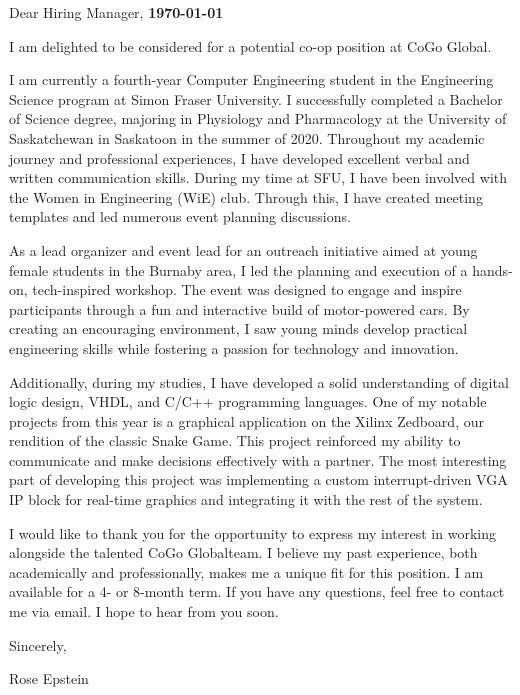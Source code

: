 \documentclass[letterpaper,11pt]{article}
\newcommand{\company}{CoGo Global\hspace{4px}}
\begin{document}
    \vspace*{10pt}
    \par Dear Hiring Manager,  \hfill \textbf{\today}
    \vspace*{10pt}
    \par I am delighted to be considered for a potential co-op position at \company{}.
    \vspace*{10pt}
    \par I am currently a fourth-year Computer Engineering student in the Engineering Science program at Simon Fraser University. I successfully
    completed a Bachelor of Science degree, majoring in Physiology and Pharmacology at the University of Saskatchewan in Saskatoon in the summer of 2020.
    Throughout my academic journey and professional experiences, I have developed excellent verbal and written communication skills. 
    During my time at SFU, I have been involved with the Women in Engineering (WiE) club. Through this, I have created meeting templates and led numerous event planning discussions. 
    \vspace*{10pt}
    \par As a lead organizer and event lead for an outreach initiative aimed at young female students in the Burnaby area, I led the planning and execution of a hands-on, tech-inspired workshop. 
    The event was designed to engage and inspire participants through a fun and interactive build of motor-powered cars. 
    By creating an encouraging environment, I saw young minds develop practical engineering skills while fostering a passion for technology and innovation.
    \vspace*{10pt}
    \par Additionally, during my studies, I have developed a solid understanding of digital logic design, VHDL, and C/C++ programming languages. 
    One of my notable projects from this year is a graphical application on the Xilinx Zedboard, our rendition of the classic Snake Game. This project reinforced 
    my ability to communicate and make decisions effectively with a partner. The most interesting part of developing this project was implementing a 
    custom interrupt-driven VGA IP block for real-time graphics and integrating it with the rest of the system.
    \vspace*{10pt}
    \par I would like to thank you for the opportunity to express my interest in working alongside
    the talented \company team. I believe my past experience, both academically and professionally, makes
    me a unique fit for this position. I am available for a 4- or 8-month term. If you have any questions, feel free to contact me via email. I hope to hear from you
    soon. 
    \vspace*{10pt}
    \par Sincerely,
    \par Rose Epstein
\end{document}
